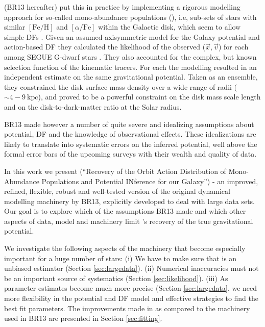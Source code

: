 \citet{2013ApJ...779..115B} (BR13 hereafter) put this in practice by implementing a rigorous modelling approach for so-called mono-abundance populations (\MAPs{}), i.e, sub-sets of stars with similar $[\mathrm{Fe}/\mathrm{H}]$ and $[\alpha/\mathrm{Fe}]$ within the Galactic disk, which seem to allow simple DFs \citep{bov12b,bov12c,2012ApJ...753..148B}. Given an assumed axisymmetric model for the Galaxy potential and action-based DF \citep{2010MNRAS.401.2318B,2011MNRAS.413.1889B,2013MNRAS.434..652T} they calculated the likelihood of the observed ($\vec{x},\vec{v}$) for each \MAP{} among SEGUE G-dwarf stars \citep{2009AJ....137.4377Y}. They also accounted for the complex, but known selection function \citep{2012ApJ...753..148B} of the kinematic tracers. For each \MAP{} the modelling resulted in an independent estimate on the same gravitational potential. Taken as an ensemble, they constrained the disk surface mass density over a wide range of radii ($\sim 4-9~\text{kpc}$), and proved to be a powerful constraint on the disk mass scale length and on the disk-to-dark-matter ratio at the Solar radius. 

BR13 made however a number of quite severe and idealizing assumptions about potential, DF and the knowledge of observational effects. These idealizations are likely to translate into systematic errors on the inferred potential, well above the formal error bars of the upcoming surveys with their wealth and quality of data.

In this work we present \RM{} (``\textsc{R}ecovery of the \textsc{O}rbit \textsc{A}ction \textsc{D}istribution of \textsc{M}ono-\textsc{A}bundance \textsc{P}opulations and \textsc{P}otential \textsc{IN}ference for our \textsc{G}alaxy'') - an improved, refined, flexible, robust and well-tested version of the original dynamical modelling machinery by BR13, explicitly developed to deal with large data sets. Our goal is to explore which of the assumptions BR13 made and which other aspects of data, model and machinery limit \RM{}'s recovery of the true gravitational potential.

We investigate the following aspects of the \RM{} machinery that become especially important for a huge number of stars: (i) We have to make sure that \RM{} is an unbiased estimator (Section \ref{sec:largedata}). (ii) Numerical inaccuracies must not be an important source of systematics (Section \ref{sec:likelihood}). (iii) As parameter estimates become much more precise (Section \ref{sec:largedata}, we need more flexibility in the potential and DF model and effective strategies to find the best fit parameters. The improvements made in \RM{} as compared to the machinery used in BR13 are presented in Section \ref{sec:fitting}.

